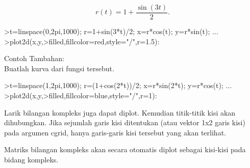 \documentclass[12pt,arial,letterpaper]{book}
\begin{document}
\begin{eulercomment}
\begin{eulercomment}
\begin{eulercomment}
\begin{eulercomment}
\begin{eulercomment}
\begin{eulercomment}
\begin{eulercomment}
\begin{eulercomment}
\begin{eulercomment}
\begin{eulercomment}
\begin{eulercomment}
\begin{eulercomment}
\begin{eulercomment}
\begin{eulercomment}
\begin{eulercomment}
\begin{eulercomment}
\begin{eulercomment}
\end{eulercomment}
\begin{eulerformula}
\[
r(t) = 1 + \dfrac{\sin(3t)}{2}.
\]
\end{eulerformula}
\begin{eulerprompt}
>t=linspace(0,2pi,1000); r=1+sin(3*t)/2; x=r*cos(t); y=r*sin(t); ...
>plot2d(x,y,>filled,fillcolor=red,style="/",r=1.5):
\end{eulerprompt}
\begin{eulercomment}
Contoh Tambahan:\\
Buatlah kurva dari fungsi tersebut.
\end{eulercomment}
\begin{eulerprompt}
>t=linspace(1,2pi,1000); r=(1+cos(2*t))/2; x=r*sin(2*t); y=r*cos(t); ...
>plot2d(x,y,>filled,fillcolor=blue,style="/",r=1):
\end{eulerprompt}
\begin{eulercomment}
Larik bilangan kompleks juga dapat diplot. Kemudian titik-titik kisi
akan dihubungkan. Jika sejumlah garis kisi ditentukan (atau vektor 1x2
garis kisi) pada argumen cgrid, hanya garis-garis kisi tersebut yang
akan terlihat.

Matriks bilangan kompleks akan secara otomatis diplot sebagai
kisi-kisi pada bidang kompleks.


\end{eulercomment}
\end{eulercomment}
\end{eulercomment}
\end{eulercomment}
\end{eulercomment}
\end{eulercomment}
\end{eulercomment}
\end{eulercomment}
\end{eulercomment}
\end{eulercomment}
\end{eulercomment}
\end{eulercomment}
\end{eulercomment}
\end{eulercomment}
\end{eulercomment}
\end{eulercomment}
\end{eulercomment}
\end{document}
